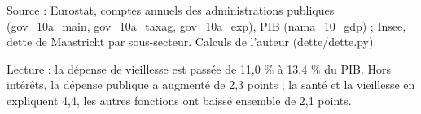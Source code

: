 Source : Eurostat, comptes annuels des administrations publiques (gov\_10a\_main, gov\_10a\_taxag, gov\_10a\_exp), PIB (nama\_10\_gdp) ; Insee, dette de Maastricht par sous-secteur. Calculs de l'auteur (dette/dette.py).\par Lecture : la dépense de vieillesse est passée de 11,0 \% à 13,4 \% du PIB. Hors intérêts, la dépense publique a augmenté de 2,3 points ; la santé et la vieillesse en expliquent 4,4, les autres fonctions ont baissé ensemble de 2,1 points.
